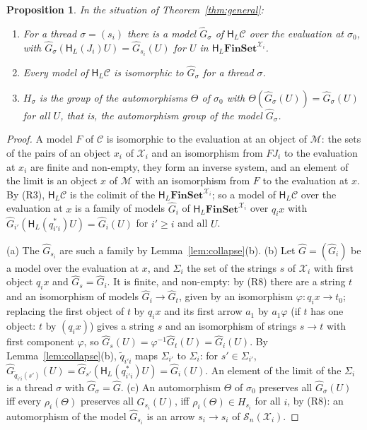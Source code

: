 \documentclass[11pt]{amsart}
\newtheorem{prop}[thm]{Proposition}
\theoremstyle{definition}
\newcommand{\Fin}{\mathbf{FinSet}}
\newcommand{\HH}{\mathsf H}
\newcommand{\cX}{\mathcal X}
\newcommand{\cC}{\mathcal C}
\newcommand{\cM}{\mathcal M}
\newcommand{\cS}{\mathcal S}
\begin{document}
\begin{prop}\label{prop:models}
In the situation of Theorem~\ref{thm:general}:
\begin{enumerate}
\item[(a)] For a thread $\sigma=(s_i)$ there is a model $\hat
G_\sigma$ of $\HH_L\cC$ over the evaluation at $\sigma_0$, with $\hat
G_\sigma(\HH_L(J_i)U)=\hat G_{s_i}(U)$ for $U$ in $\HH_L\Fin^{\cX_i}$.
\item[(b)] Every model of $\HH_L\cC$ is isomorphic to $\hat G_\sigma$
for a thread $\sigma$.
\item[(c)] $H_\sigma$ is the group of the automorphisms $\Theta$ of
$\sigma_0$ with $\Theta(\hat G_\sigma(U))=\hat G_\sigma(U)$ for all
$U$, that is, the automorphism group of the model $\hat G_\sigma$.
\end{enumerate}
\end{prop}
\begin{proof}
A model $F$ of $\cC$ is isomorphic to the evaluation at an object of
$\cM$: the sets of the pairs of an object $x_i$ of $\cX_i$ and an
isomorphism from $FJ_i$ to the evaluation at $x_i$ are finite and
non-empty, they form an inverse system, and an element of the limit is
an object $x$ of $\cM$ with an isomorphism from $F$ to the evaluation
at $x$. By (R3), $\HH_L\cC$ is the colimit of the $\HH_L\Fin^{\cX_i}$;
so a model of $\HH_L\cC$ over the evaluation at $x$ is a family of
models $\hat G_i$ of $\HH_L\Fin^{\cX_i}$ over $q_ix$ with $\hat
G_{i'}(\HH_L(q_{i'i}^*)U)=\hat G_i(U)$ for $i'\ge i$ and all $U$.

(a) The $\hat G_{s_i}$ are such a family by
Lemma~\ref{lem:collapse}(b). (b) Let $\hat G=(\hat G_i)$ be a model
over the evaluation at $x$, and $\Sigma_i$ the set of the strings $s$
of $\cX_i$ with first object $q_ix$ and $\hat G_s=\hat G_i$. It is
finite, and non-empty: by (R8) there are a string $t$ and an
isomorphism of models $\hat G_i\to\hat G_t$, given by an isomorphism
$\varphi\colon q_ix\to t_0$; replacing the first object of $t$ by
$q_ix$ and its first arrow $a_1$ by $a_1\varphi$ (if $t$ has one
object: $t$ by $(q_ix)$) gives a string $s$ and an isomorphism of
strings $s\to t$ with first component $\varphi$, so $\hat
G_s(U)=\varphi^{-1}\hat G_t(U)=\hat G_i(U)$. By
Lemma~\ref{lem:collapse}(b), $\tilde q_{i'i}$ maps $\Sigma_{i'}$ to
$\Sigma_i$: for $s'\in\Sigma_{i'}$, $\hat G_{\tilde q_{i'i}(s')}(U)=
\hat G_{s'}(\HH_L(q_{i'i}^*)U)=\hat G_i(U)$. An element of the limit
of the $\Sigma_i$ is a thread $\sigma$ with $\hat G_\sigma=\hat G$.
(c) An automorphism $\Theta$ of $\sigma_0$ preserves all $\hat
G_\sigma(U)$ iff every $\rho_i(\Theta)$ preserves all $\hat
G_{s_i}(U)$, iff $\rho_i(\Theta)\in H_{s_i}$ for all $i$, by (R8): an
automorphism of the model $\hat G_{s_i}$ is an arrow $s_i\to s_i$ of
$\cS_n(\cX_i)$.
\end{proof}
\end{document}
